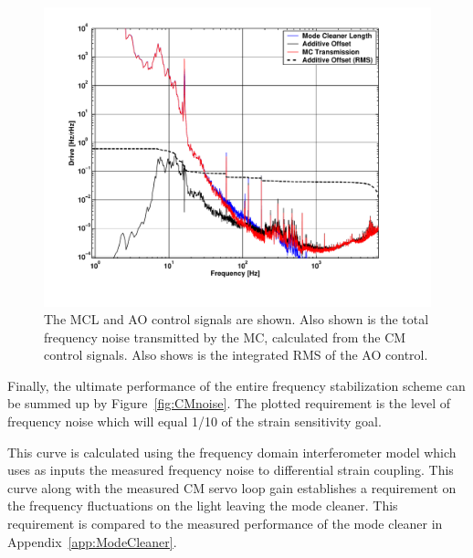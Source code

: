 \begin{figure}[!h]
\centerline{\includegraphics[angle=0,width=6.5in]{Figures/Chap5/cmnoise3.pdf}}
\caption[CM Noise]{The MCL and AO control signals are shown. Also shown is the
         total frequency noise transmitted by the MC, calculated from the CM
         control signals. Also shows is the integrated RMS of the AO control.}
\label{fig:CMcontrols}
\end{figure}


Finally, the ultimate performance of the entire frequency stabilization scheme
can be summed up by Figure~\ref{fig:CMnoise}. The plotted requirement is the
level of frequency noise which will equal 1/10 of the strain sensitivity goal.

This curve is calculated using the frequency domain interferometer model which
uses as inputs the measured frequency noise to differential strain coupling. This
curve along with the measured CM servo loop gain establishes a requirement on the
frequency fluctuations on the light leaving the mode cleaner. This requirement is
compared to the measured performance of the mode cleaner in 
Appendix~\ref{app:ModeCleaner}.

